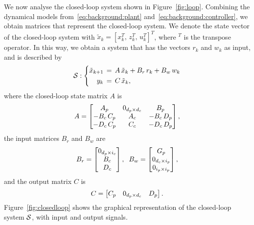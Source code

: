 We now analyse the closed-loop system shown in Figure~\ref{fig:loop}.
Combining the dynamical models from~\eqref{eq:background:plant} and~\eqref{eq:background:controller}, we obtain matrices that represent the closed-loop system.
We denote the state vector of the closed-loop system with $\tilde{x}_k = \left[ x_k^T,\, z_k^T,\, u_k^T \right]^T$, where $^T$ is the transpose operator.
In this way, we obtain a system that has the vectors $r_k$ and $w_k$ as input, and is described by
%
\begin{equation} 
\label{eq:feedback-basic}
    \mathcal{S} : \left\{
    \begin{aligned}
        \tilde{x}_{k+1} &\,=\, A\,\tilde{x}_{k} + B_r\,r_{k} + B_w\,w_{k}\\
        y_{k} &\,=\, C\,\tilde{x}_{k},
    \end{aligned} \right.
\end{equation}
%
where the closed-loop state matrix $A$ is
%
\begin{equation}
\label{eq:matrixA}
    A =
    \begin{bmatrix} A_p       & 0_{d_p \times d_c} & B_p \\
                    -B_c\,C_p & A_c                                      & -B_c\,D_p \\
                    -D_c\,C_p & C_c                                      & -D_c\,D_p
    \end{bmatrix},
\end{equation}
%
the input matrices $B_r$ and $B_w$ are
%
\begin{equation}
    B_r = \begin{bmatrix} 0_{d_p \times i_c} \\ B_c \\ D_c \end{bmatrix},\;\;
    B_w = \begin{bmatrix} G_p \\ 0_{d_c \times i_p} \\ 0_{i_p \times i_p} \end{bmatrix},
\end{equation}
%
and the output matrix $C$ is
%
\begin{equation}
    C = \begin{bmatrix} C_p & 0_{d_p \times d_c} & D_p \end{bmatrix}.
\end{equation}
%
Figure~\ref{fig:closedloop} shows the graphical representation of the closed-loop system $\mathcal{S}$, with input and output signals.

